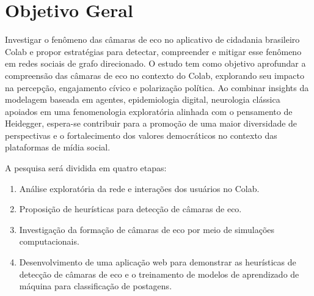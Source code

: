 \section{Objetivo Geral}
Investigar o fenômeno das câmaras de eco no aplicativo de cidadania brasileiro Colab e propor estratégias para detectar, compreender e mitigar esse fenômeno em redes sociais de grafo direcionado. O estudo tem como objetivo aprofundar a compreensão das câmaras de eco no contexto do Colab, explorando seu impacto na percepção, engajamento cívico e polarização política. Ao combinar insights da modelagem baseada em agentes, epidemiologia digital, neurologia clássica apoiados em uma fenomenologia exploratória alinhada com o pensamento de Heidegger, espera-se contribuir para a promoção de uma maior diversidade de perspectivas e o fortalecimento dos valores democráticos no contexto das plataformas de mídia social.

A pesquisa será dividida em quatro etapas:

\begin{enumerate}
  \item Análise exploratória da rede e interações dos usuários no Colab.
  \item Proposição de heurísticas para detecção de câmaras de eco.
  \item Investigação da formação de câmaras de eco por meio de simulações computacionais.
  \item Desenvolvimento de uma aplicação web para demonstrar as heurísticas de detecção de câmaras de eco e o treinamento de modelos de aprendizado de máquina para classificação de postagens.
\end{enumerate}

